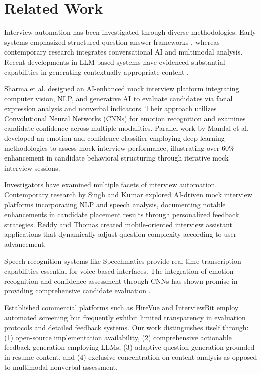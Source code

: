 \documentclass[conference]{IEEEtran}
\begin{document}
\section{Related Work}

Interview automation has been investigated through diverse methodologies. Early systems emphasized structured question-answer frameworks \cite{smith2020automated}, whereas contemporary research integrates conversational AI and multimodal analysis. Recent developments in LLM-based systems have evidenced substantial capabilities in generating contextually appropriate content \cite{brown2020language}. 

Sharma et al. \cite{sharma2025cv} designed an AI-enhanced mock interview platform integrating computer vision, NLP, and generative AI to evaluate candidates via facial expression analysis and nonverbal indicators. Their approach utilizes Convolutional Neural Networks (CNNs) for emotion recognition and examines candidate confidence across multiple modalities. Parallel work by Mandal et al. \cite{mandal2023emotion} developed an emotion and confidence classifier employing deep learning methodologies to assess mock interview performance, illustrating over 60\% enhancement in candidate behavioral structuring through iterative mock interview sessions.

Investigators have examined multiple facets of interview automation. Contemporary research by Singh and Kumar \cite{singh2024nlp} explored AI-driven mock interview platforms incorporating NLP and speech analysis, documenting notable enhancements in candidate placement results through personalized feedback strategies. Reddy and Thomas \cite{reddy2024mobile} created mobile-oriented interview assistant applications that dynamically adjust question complexity according to user advancement.

Speech recognition systems like Speechmatics \cite{speechmatics2024} provide real-time transcription capabilities essential for voice-based interfaces. The integration of emotion recognition and confidence assessment through CNNs has shown promise in providing comprehensive candidate evaluation \cite{sharma2025cv, mandal2023emotion}.

Established commercial platforms such as HireVue and InterviewBit employ automated screening but frequently exhibit limited transparency in evaluation protocols and detailed feedback systems. Our work distinguishes itself through: (1) open-source implementation availability, (2) comprehensive actionable feedback generation employing LLMs, (3) adaptive question generation grounded in resume content, and (4) exclusive concentration on content analysis as opposed to multimodal nonverbal assessment.
\end{document}
